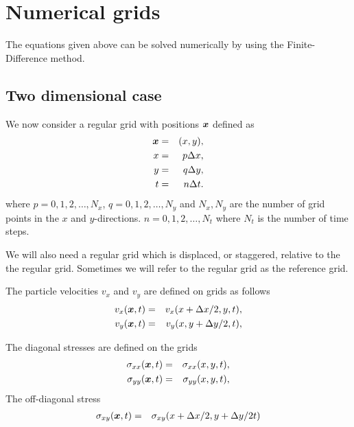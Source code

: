 \documentclass[11pt]{article}
\begin{document}
\section{Numerical grids}
The equations given above can be solved numerically by using the 
Finite-Difference method. 

\subsection{Two dimensional case}

We now consider a regular grid with positions $\mbox{\boldmath $x$}$ 
defined as
\begin{eqnarray}
\mbox{\boldmath $x$} & = & (x,y),\\
x   & = & p\Delta x,\\
y   & = & q\Delta y,\\
t   & = & n\Delta t.
\end{eqnarray}
where $p=0,1,2,\ldots,N_x$, $q=0,1,2,\ldots,N_y$ and
$N_x,N_y$ are the number of grid points in the $x$ and 
$y$-directions.
$n=0,1,2,\ldots,N_t$ where $N_t$ is the number of time steps.

We will also need a regular grid which is displaced, or staggered, 
relative to the the regular grid.
Sometimes we will refer to the regular grid as the reference grid.

The particle velocities  $v_x$ and $v_y$ are defined on grids
as follows
%
\begin{eqnarray}
  v_x(\mbox{\boldmath $x$}, t) & = & v_x(x+\Delta x/2, y, t),\nonumber\\
  v_y(\mbox{\boldmath $x$}, t) & = & v_y(x, y+\Delta y/2, t),\nonumber\\
\end{eqnarray}
%


The diagonal stresses are defined on the grids
\begin{eqnarray}
  \sigma_{xx}(\mbox{\boldmath $x$}, t) & = & \sigma_{xx}( x,y,t), \nonumber\\
  \sigma_{yy}(\mbox{\boldmath $x$}, t) & = & \sigma_{yy}(x, y,t), \nonumber\\
\end{eqnarray}
The off-diagonal stress 
%
\begin{eqnarray}
  \sigma_{xy}(\mbox{\boldmath $x$}, t) & = & \sigma_{xy}(x +\Delta x/2, y+\Delta y/2t) 
                                        \nonumber\\
\end{eqnarray}
\end{document}
